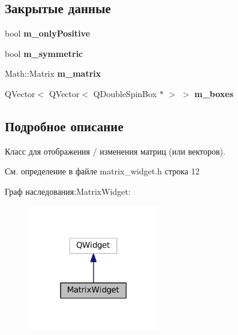 \subsection*{Закрытые данные}
\begin{DoxyCompactItemize}
\item 
\hypertarget{class_matrix_widget_a82f2f645dfe6a61844cbcaa7b9d74c5f}{}\label{class_matrix_widget_a82f2f645dfe6a61844cbcaa7b9d74c5f} 
bool {\bfseries m\+\_\+only\+Positive}
\item 
\hypertarget{class_matrix_widget_ad3c5c9a7eb76b52d92ff88e5aac69df8}{}\label{class_matrix_widget_ad3c5c9a7eb76b52d92ff88e5aac69df8} 
bool {\bfseries m\+\_\+symmetric}
\item 
\hypertarget{class_matrix_widget_a45e4733316b0de574c8f333e3f89bd4c}{}\label{class_matrix_widget_a45e4733316b0de574c8f333e3f89bd4c} 
Math\+::\+Matrix {\bfseries m\+\_\+matrix}
\item 
\hypertarget{class_matrix_widget_ab3a0c3c5c847e0a35aa23a6a7e7d56f6}{}\label{class_matrix_widget_ab3a0c3c5c847e0a35aa23a6a7e7d56f6} 
Q\+Vector$<$ Q\+Vector$<$ Q\+Double\+Spin\+Box $\ast$ $>$ $>$ {\bfseries m\+\_\+boxes}
\end{DoxyCompactItemize}


\subsection{Подробное описание}
Класс для отображения / изменения матриц (или векторов). 

См. определение в файле matrix\+\_\+widget.\+h строка 12



Граф наследования\+:Matrix\+Widget\+:\nopagebreak
\begin{figure}[H]
\begin{center}
\leavevmode
\includegraphics[width=162pt]{class_matrix_widget__inherit__graph}
\end{center}
\end{figure}


